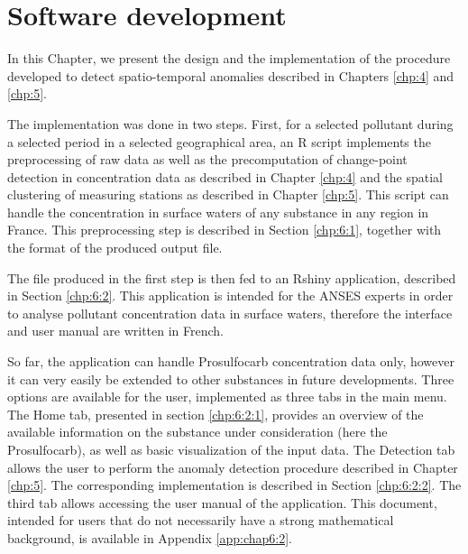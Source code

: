\chapter{Software development}\label{chp:6}

\minitoc

\clearpage


In this Chapter, we present the design and the implementation of the procedure developed to detect spatio-temporal anomalies described in Chapters \ref{chp:4} and \ref{chp:5}.


The implementation was done in two steps. First, for a selected pollutant during a selected period in a selected geographical area, an R script implements the preprocessing of raw data as well as the precomputation of change-point detection in concentration data as described in Chapter \ref{chp:4} and the spatial clustering of measuring stations as described in Chapter \ref{chp:5}. This script can handle the concentration in surface waters of any substance in any region in France. This preprocessing step is described in Section \ref{chp:6:1}, together with the format of the produced output file.

The file produced in the first step is then fed to an Rshiny application, described in Section \ref{chp:6:2}. This application is intended for the ANSES experts in order to analyse pollutant concentration data in surface waters, therefore the interface and user manual are written in French. 

So far, the application can handle Prosulfocarb concentration data only, however it can very easily be extended to other substances in future developments. Three options are available for the user, implemented as three tabs in the main menu. The Home tab, presented in section \ref{chp:6:2:1}, provides an overview of the available information on the substance under consideration (here the Prosulfocarb), as well as basic visualization of the input data. The Detection tab allows the user to perform the anomaly detection procedure described in Chapter \ref{chp:5}. The corresponding implementation is described in Section \ref{chp:6:2:2}. The third tab allows accessing the user manual of the application. This document, intended for users that do not necessarily have a strong mathematical background, is available in Appendix \ref{app:chap6:2}. 



